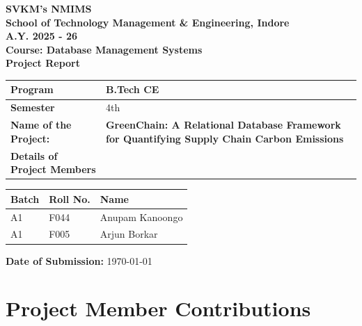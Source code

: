 \documentclass[12pt,a4paper]{article}
\begin{document}
\begin{center}
    \vspace*{1cm}
    \textbf{\huge SVKM’s NMIMS} \\
    \vspace{0.5cm}
    \textbf{\Large School of Technology Management \& Engineering, Indore} \\
    \vfill
    \textbf{\large A.Y. 2025 - 26} \\
    \vspace{1cm}
    \textbf{\Large Course: Database Management Systems} \\
    \vspace{0.5cm}
    \textbf{\huge Project Report} \\
    \vfill
    
    \renewcommand{\arraystretch}{1.8}
    \begin{tabularx}{\textwidth}{|l|X|}
        \hline
        \textbf{Program} & B.Tech CE \\ \hline
        \textbf{Semester} & 4th \\ \hline
        \textbf{Name of the Project:} & \textbf{GreenChain: A Relational Database Framework for Quantifying Supply Chain Carbon Emissions} \\ \hline
        \textbf{Details of Project Members} & \\ \hline
    \end{tabularx}
    
    \vspace{1cm}
    
    \begin{tabularx}{\textwidth}{|l|l|X|}
        \hline
        \textbf{Batch} & \textbf{Roll No.} & \textbf{Name} \\ \hline
        A1 & F044 & Anupam Kanoongo \\ \hline
        A1 & F005 & Arjun Borkar \\ \hline
    \end{tabularx}
    
    \vfill
    \textbf{\Large Date of Submission:} \today
    \vspace*{1cm}
\end{center}

\newpage

\section*{Project Member Contributions}
\end{document}

